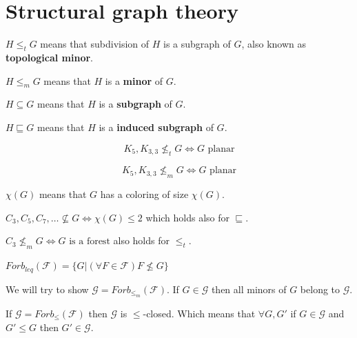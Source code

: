 \chapter{Structural graph theory}

\begin{defn}
	$H \leq_{t} G$ means that subdivision of $H$ is a subgraph of $G$, also known as \textbf{topological minor}.
\end{defn}

\begin{defn}
	$H \leq_{m} G$ means that $H$ is a \textbf{minor} of $G$.
\end{defn}

\begin{defn}
	$H \subseteq G$ means that $H$ is a \textbf{subgraph} of $G$.
\end{defn}

\begin{defn}
	$H \sqsubseteq G$ means that $H$ is a \textbf{induced subgraph} of $G$.
\end{defn}

\begin{thm}[Kuratowski]
	$$
	K_{5}, K_{3,3} \nleq_{t} G \Leftrightarrow G \text{ planar}
	$$
	
	$$
	K_{5}, K_{3,3} \nleq_{m} G \Leftrightarrow G \text{ planar}
	$$
\end{thm}

\begin{defn}
	$\chi(G)$ means that $G$ has a coloring of size $\chi(G)$.
\end{defn}

\begin{observ}
	$C_{3}, C_{5}, C_{7}, \dots \nsubseteq G \Leftrightarrow \chi(G) \leq 2$ which holds also for $\sqsubseteq$.
\end{observ}

\begin{observ}
	$C_{3} \nleq_{m} G \Leftrightarrow G \text{ is a forest}$ also holds for $\leq_{t}$.
\end{observ}

\begin{defn}
	$Forb_{leq} (\mathcal{F}) = \{G | (\forall F \in \mathcal{F}) F \nleq G\}$
\end{defn}

We will try to show $\mathcal{G} = Forb_{\leq_{m}} (\mathcal{F})$. If $G \in \mathcal{G}$ then all minors of $G$ belong to $\mathcal{G}$.

\begin{observ}
	If $\mathcal{G} = Forb_{\leq}(\mathcal{F})$ then $\mathcal{G}$ is $\leq$-closed. Which means that $\forall G,G'$ if $G \in \mathcal{G}$ and $G' \leq G$ then $G' \in \mathcal{G}$.
\end{observ}

